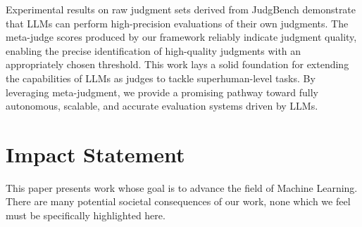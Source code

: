 \documentclass{article}
\theoremstyle{plain}
\theoremstyle{definition}
\theoremstyle{remark}
\begin{document}
Experimental results on raw judgment sets derived from JudgBench demonstrate that LLMs can perform high-precision evaluations of their own judgments. The meta-judge scores produced by our framework reliably indicate judgment quality, enabling the precise identification of high-quality judgments with an appropriately chosen threshold.
This work lays a solid foundation for extending the capabilities of LLMs as judges to tackle superhuman-level tasks. By leveraging meta-judgment, we provide a promising pathway toward fully autonomous, scalable, and accurate evaluation systems driven by LLMs.



\section*{Impact Statement}
This paper presents work whose goal is to advance the field of Machine Learning. There are many potential societal consequences of our work, none which we feel must be specifically highlighted here.



\nocite{langley00}





\newpage
\appendix
\onecolumn
\end{document}
